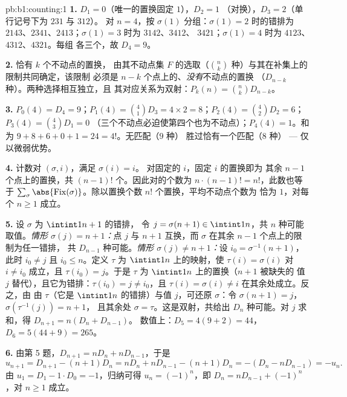 \begin{solution}{pb:b1:counting:1}
\textbf{1.} $D_1 = 0$（唯一的置换固定 $1$），$D_2 = 1$
（对换），$D_3 = 2$（单行记号下为 $231$ 与 $312$）。
对 $n = 4$，按 $\sigma(1)$ 分组：$\sigma(1) = 2$ 时的错排为
$2143$、$2341$、$2413$；$\sigma(1) = 3$ 时为 $3142$、$3412$、
$3421$；$\sigma(1) = 4$ 时为 $4123$、$4312$、$4321$。每组
各三个，故 $D_4 = 9$。

\textbf{2.} 恰有 $k$ 个不动点的置换，
由其不动点集 $F$ 的选取（$\binom nk$
种）与其在补集上的限制共同确定，该限制
必须是 $n - k$ 个点上的、\emph{没有}不动点的置换
（$D_{n-k}$ 种）。两种选择相互独立，且
其对应关系为双射：$P_k(n) = \binom nk D_{n-k}$。

\textbf{3.} $P_0(4) = D_4 = 9$；$P_1(4) = \binom41 D_3 = 4 \times 2
= 8$；$P_2(4) = \binom42 D_2 = 6$；$P_3(4) = \binom43 D_1 = 0$
（三个不动点必迫使第四个也为不动点）；$P_4(4) = 1$。和为 $9 + 8 + 6
+ 0 + 1 = 24 = 4!$。无匹配（$9$ 种）
胜过恰有一个匹配（$8$ 种） --- 仅以微弱优势。

\textbf{4.} 计数对 $(\sigma, i)$，满足 $\sigma(i) = i$。
对固定的 $i$，固定 $i$ 的置换即为
其余 $n - 1$ 个点上的置换，共 $(n-1)!$ 个。因此对的个数为
$n \cdot (n-1)! = n!$，此数也等于
$\sum_\sigma \abs{\mathrm{Fix}(\sigma)}$。除以置换个数
$n!$ 个置换，平均不动点个数为
恰为 $1$，对每个 $n \geq 1$ 成立。

\textbf{5.} 设 $\sigma$ 为 $\intint1{n+1}$ 的错排，
令 $j = \sigma(n+1) \in \intint1n$，共 $n$ 种可能取值。\emph{情形
$\sigma(j) = n+1$：}点 $j$ 与 $n+1$ 互换，而 $\sigma$
在其余 $n - 1$ 个点上的限制为任一错排，
共 $D_{n-1}$ 种可能。\emph{情形 $\sigma(j)
\neq n+1$：}设 $i_0 = \sigma^{-1}(n+1)$，此时 $i_0 \neq j$ 且
$i_0 \leq n$。定义 $\tau$ 为 $\intint1n$ 上的映射，使 $\tau(i) = \sigma(i)$
对 $i \neq i_0$ 成立，且 $\tau(i_0) = j$。于是 $\tau$ 为
$\intint1n$ 上的置换（$n+1$ 被缺失的
值 $j$ 替代），且它为错排：$\tau(i_0) = j \neq i_0$，且
$\tau(i) = \sigma(i) \neq i$ 在其余处成立。反之，由
由 $\tau$（它是 $\intint1n$ 的错排）与值 $j$，可还原
$\sigma$：令 $\sigma(n+1) = j$，$\sigma(\tau^{-1}(j)) = n+1$，
且其余处 $\sigma = \tau$。这是双射，共给出 $D_n$
种可能。对 $j$ 求和，得 $D_{n+1} = n(D_n + D_{n-1})$。
数值上：$D_5 = 4(9 + 2) = 44$，$D_6 = 5(44 + 9) = 265$。

\textbf{6.} 由第 5 题，$D_{n+1} = nD_n + nD_{n-1}$，于是
\[
u_{n+1} = D_{n+1} - (n+1)D_n = nD_n + nD_{n-1} - (n+1)D_n
= -(D_n - nD_{n-1}) = -u_n .
\]
由 $u_1 = D_1 - 1 \cdot D_0 = -1$，归纳可得 $u_n =
(-1)^n$，即 $D_n = nD_{n-1} + (-1)^n$，对 $n \geq 1$ 成立。


\end{solution}
